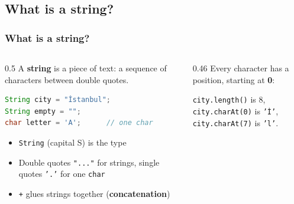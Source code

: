 \documentclass[aspectratio=169,10pt,compress]{beamer}
\begin{document}

\subsection[What]{What is a string?}




\begin{frame}[t,fragile] \frametitle{What is a string?}
  \begin{columns}[T]
    \begin{column}{0.5\textwidth}
      A \textbf{string} is a piece of text: a sequence of characters between double quotes.


\begin{lstlisting}[style=codesnippet, language=Java]
String city = "İstanbul";
String empty = "";
char letter = 'A';      // one char
\end{lstlisting}



      \begin{itemize}\small
        \item \texttt{String} (capital S) is the type
        \item Double quotes \texttt{"..."} for strings, single quotes \texttt{'.'} for one \texttt{char}
        \item \texttt{+} glues strings together (\textbf{concatenation})
      \end{itemize}
    \end{column}
    \begin{column}{0.46\textwidth}
      \small Every character has a position, starting at \textbf{0}:
      \vspace{0.6em}
      \begin{center}
      \end{center}
      \vspace{0.4em}
      \small \texttt{city.length()} is 8,\\
      \texttt{city.charAt(0)} is \texttt{'İ'},\\
      \texttt{city.charAt(7)} is \texttt{'l'}.
    \end{column}
  \end{columns}
\end{frame}
\end{document}
